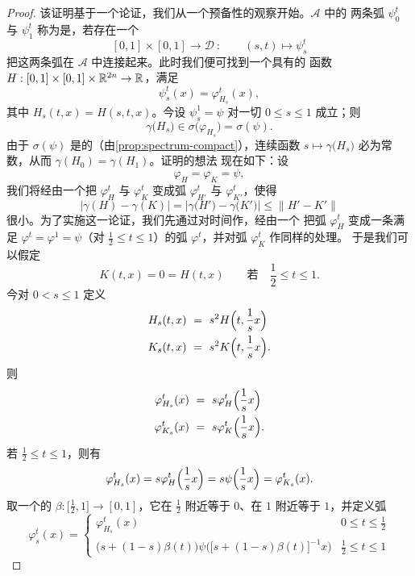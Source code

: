 \begin{proof}
该证明基于一个\trHomotopy{}论证，我们从一个预备性的观察开始。$\mathcal{A}$ 中的%
两条弧 $\psi^{t}_{0}$ 与 $\psi^{t}_{1}$ 称为是\trHomotopic，若存在一个%
\trSmooth\trMapping
\[
[0,1]\times[0,1]\longrightarrow\mathcal{D}\ :\qquad(s,t)\mapsto\psi^{t}_{s}
\]
把这两条弧在 $\mathcal{A}$ 中连接起来。此时我们便可找到一个具有\trCompactSupport{}的%
\trSmooth{}函数 $H:[0,1]\times[0,1]\times\mathbb{R}^{2n}\to\mathbb{R}$，满足
\[
\psi^{t}_{s}(x)=\varphi^{t}_{H_{s}}(x),
\]
其中 $H_{s}(t,x)=H(s,t,x)$。今设 $\psi^{1}_{s}=\psi$ 对一切 $0\leq s\leq1$ 成立；则
\[
\gamma\bigl(H_{s}\bigr)\in\sigma\bigl(\varphi_{H_{s}}\bigr)=\sigma(\psi).
\]
由于 $\sigma(\psi)$ 是\trNowhereDense{}的（由\cref{prop:spectrum-compact}），连续函数%
$s\mapsto\gamma\bigl(H_{s}\bigr)$ 必为常数，从而 $\gamma(H_{0})=\gamma(H_{1})$。证明的想法%
现在如下：设
\[
\varphi_{H}=\varphi_{K}=\psi,
\]
我们将经由一个\trHomotopy{}把 $\varphi^{t}_{H}$ 与 $\varphi^{t}_{K}$ 变成弧%
$\varphi^{t}_{H'}$ 与 $\varphi^{t}_{K'}$，使得
\[
\bigl\lvert\gamma(H)-\gamma(K)\bigr\rvert=\bigl\lvert\gamma\bigl(H'\bigr)-\gamma\bigl(K'\bigr)\bigr\rvert\leq\bigl\lVert H'-K'\bigr\rVert
\]
很小。为了实施这一论证，我们先通过对时间作\trReparametrization，经由一个%
\trHomotopy{}把弧 $\varphi^{t}_{H}$ 变成一条满足 $\varphi^{t}=\varphi^{1}=\psi$（对%
$\frac{1}{2}\leq t\leq1$）的弧 $\varphi^{t}$，并对弧 $\varphi^{t}_{K}$ 作同样的处理。%
于是我们可以假定
\[
K(t,x)=0=H(t,x)\qquad\text{若}\quad\frac{1}{2}\leq t\leq1.
\]
今对 $0<s\leq1$ 定义
\begin{align*}
H_{s}(t,x)\ &=\ s^{2}H\Bigl(t,\frac{1}{s}x\Bigr)\\
K_{s}(t,x)\ &=\ s^{2}K\Bigl(t,\frac{1}{s}x\Bigr).
\end{align*}
则
\begin{align*}
\varphi^{t}_{H_{s}}(x)\ &=\ s\varphi^{t}_{H}\Bigl(\frac{1}{s}x\Bigr)\\
\varphi^{t}_{K_{s}}(x)\ &=\ s\varphi^{t}_{K}\Bigl(\frac{1}{s}x\Bigr).
\end{align*}
若 $\frac{1}{2}\leq t\leq1$，则有
\[
\varphi^{t}_{H_{s}}(x)=s\varphi^{t}_{H}\Bigl(\frac{1}{s}x\Bigr)=s\psi\Bigl(\frac{1}{s}x\Bigr)=\varphi^{t}_{K_{s}}(x).
\]
取一个\trSmooth{}的 $\beta:\bigl[\frac{1}{2},1\bigr]\to[0,1]$，它在 $\frac{1}{2}$ 附近等于%
$0$、在 $1$ 附近等于 $1$，并定义弧
\[
\varphi^{t}_{s}(x)=
\begin{cases}
\varphi^{t}_{H_{s}}(x) & 0\leq t\leq\frac{1}{2}\\[1mm]
\bigl(s+(1-s)\beta(t)\bigr)\psi\bigl(\bigl[s+(1-s)\beta(t)\bigr]^{-1}x\bigr) & \frac{1}{2}\leq t\leq1

\end{cases}\]
\end{proof}
